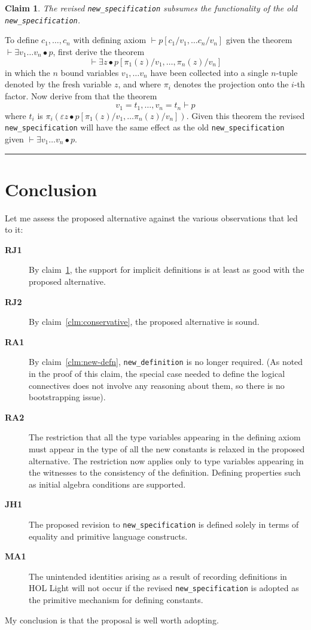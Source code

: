 ﻿\documentclass[12pt]{article}
\def\JHi{{\bf JH1}}
\def\MAi{{\bf MA1}}
\def\RAi{{\bf RA1}}
\def\RAii{{\bf RA2}}
\def\RJi{{\bf RJ1}}
\def\RJii{{\bf RJ2}}
\def\NewDefn{{\tt new\_definition}}
\def\NewSpec{{\tt new\_specification}}
\def\Done{\hfill\rule{0.5em}{0.5em}}
\newtheorem{Claim}{Claim}
\begin{document}
\begin{Claim}\label{clm:old-new-spec}
The revised {\NewSpec} subsumes the functionality of the old {\NewSpec}.
\end{Claim}
To define $c_1, \ldots, c_n$ with defining axiom $\vdash p[c_1/v_1, \ldots c_n/v_n]$ given the theorem
$\vdash \exists v_1 \ldots v_n \bullet p$, first derive the theorem
$$
\vdash \exists z\bullet p[\pi_1(z)/v_1, \ldots, \pi_n(z)/v_n]
$$
\noindent in which the $n$ bound variables
$v_1, \ldots v_n$ have been collected into a single $n$-tuple denoted by the fresh variable $z$, and where $\pi_i$ denotes the projection onto the $i$-th factor.
Now derive from that  the  theorem
$$
v_1 = t_1, \ldots, v_n = t_n \vdash p
$$
\noindent where $t_i$
is $\pi_i(\varepsilon z\bullet p[\pi_1(z)/v_1, \ldots \pi_n(z)/v_n])$.
Given this theorem the revised {\NewSpec} will have the same effect as the old {\NewSpec}
given $\vdash \exists v_1 \ldots v_n \bullet p$.
\Done

\section{Conclusion}

Let me assess the proposed alternative against the various observations that led to it:

\begin{description}
\item[\RJi] By claim~\ref{clm:old-new-spec}, the support for implicit definitions is at least as good with the proposed alternative.
\item[\RJii] By claim~\ref{clm:conservative}, the proposed alternative is sound.
\item[\RAi] By claim~\ref{clm:new-defn}, {\NewDefn} is no longer required. (As noted in the proof of this claim, the special case needed to define the logical connectives does not involve any reasoning about them, so there is no bootstrapping issue).
\item[\RAii] The restriction that all the type variables appearing in the defining axiom must appear in the type of all the new constants is relaxed in the proposed alternative. The restriction now applies only to type variables appearing in the witnesses to the consistency of the definition. Defining properties such as initial algebra conditions are supported. 
\item[\JHi] The proposed revision to {\NewSpec} is defined solely in terms of equality and primitive language constructs.
\item[\MAi] The unintended identities arising as a result of recording definitions in HOL Light will not occur if the revised {\NewSpec} is adopted as the primitive mechanism for defining constants.
\end{description}

My conclusion is that the proposal is well worth adopting.
\end{document}
